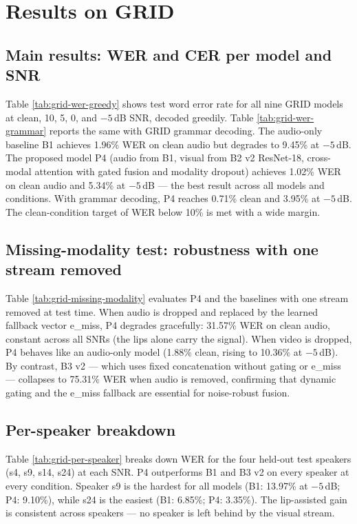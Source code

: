 
\section{Results on GRID}
\label{sec:results}

\subsection{Main results: WER and CER per model and SNR}

Table \ref{tab:grid-wer-greedy} shows test word error rate for all nine GRID models at clean, 10, 5, 0, and $-5$\,dB SNR, decoded greedily. Table \ref{tab:grid-wer-grammar} reports the same with GRID grammar decoding. The audio-only baseline B1 achieves 1.96\% WER on clean audio but degrades to 9.45\% at $-5$\,dB. The proposed model P4 (audio from B1, visual from B2 v2 ResNet-18, cross-modal attention with gated fusion and modality dropout) achieves 1.02\% WER on clean audio and 5.34\% at $-5$\,dB --- the best result across all models and conditions. With grammar decoding, P4 reaches 0.71\% clean and 3.95\% at $-5$\,dB. The clean-condition target of WER below 10\% is met with a wide margin.

\subsection{Missing-modality test: robustness with one stream removed}

Table \ref{tab:grid-missing-modality} evaluates P4 and the baselines with one stream removed at test time. When audio is dropped and replaced by the learned fallback vector e\_miss, P4 degrades gracefully: 31.57\% WER on clean audio, constant across all SNRs (the lips alone carry the signal). When video is dropped, P4 behaves like an audio-only model (1.88\% clean, rising to 10.36\% at $-5$\,dB). By contrast, B3 v2 --- which uses fixed concatenation without gating or e\_miss --- collapses to 75.31\% WER when audio is removed, confirming that dynamic gating and the e\_miss fallback are essential for noise-robust fusion.

\subsection{Per-speaker breakdown}

Table \ref{tab:grid-per-speaker} breaks down WER for the four held-out test speakers (s4, s9, s14, s24) at each SNR. P4 outperforms B1 and B3 v2 on every speaker at every condition. Speaker s9 is the hardest for all models (B1: 13.97\% at $-5$\,dB; P4: 9.10\%), while s24 is the easiest (B1: 6.85\%; P4: 3.35\%). The lip-assisted gain is consistent across speakers --- no speaker is left behind by the visual stream.

